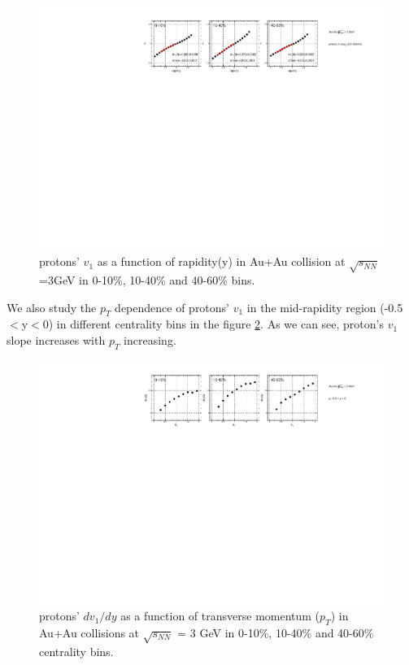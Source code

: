 \begin{figure}[h]
\includegraphics[scale=0.8]{chapter3/fig/v1ypikp/protonp_v1y_wide_cent.pdf}
\caption{\label{proton_v1y_widecent} protons' $v_{1}$ as a function of rapidity(y) in Au+Au collision at $\sqrt{s_{NN}}$=3GeV in 0-10\%, 10-40\% and 40-60\% bins.}
\end{figure}

\clearpage

We also study the $p_{T}$ dependence of protons' $v_{1}$ in the mid-rapidity region (-0.5$<$y$<$0) in different centrality bins in the figure \ref{proton_dv1pt_widecent}. As we can see, proton's $v_{1}$ slope increases with $p_{T}$ increasing. 



\begin{figure}[h]
\includegraphics[scale=0.7]{FXT3gev/chapter3/fig/v1ptpikp/prp_dv1pt_widecent.pdf}
\caption{protons' $dv_{1}/dy$ as a function of transverse momentum ($p_{T}$) in Au+Au collisions at $\sqrt{s_{NN}}$ = 3 GeV in 0-10\%, 10-40\% and 40-60\% centrality bins.}
\label{proton_dv1pt_widecent}
\end{figure}




